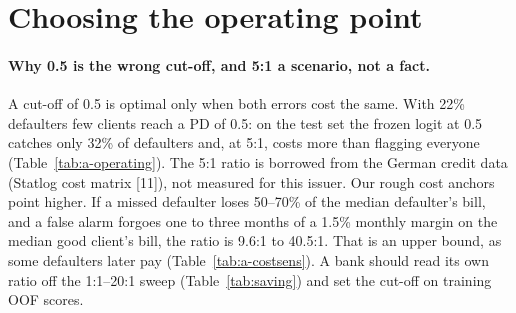 \section{Choosing the operating point}

\paragraph{Why 0.5 is the wrong cut-off, and 5:1 a scenario, not a fact.}
A cut-off of 0.5 is optimal only when both errors cost the same. With 22\% defaulters few clients reach a PD of 0.5: on the test set the frozen logit at 0.5 catches only 32\% of defaulters and, at 5:1, costs more than flagging everyone (Table~\ref{tab:a-operating}). The 5:1 ratio is borrowed from the German credit data (Statlog cost matrix [11]), not measured for this issuer. Our rough cost anchors point higher. If a missed defaulter loses 50--70\% of the median defaulter's bill, and a false alarm forgoes one to three months of a 1.5\% monthly margin on the median good client's bill, the ratio is 9.6:1 to 40.5:1. That is an upper bound, as some defaulters later pay (Table~\ref{tab:a-costsens}). A bank should read its own ratio off the 1:1--20:1 sweep (Table~\ref{tab:saving}) and set the cut-off on training OOF scores.

